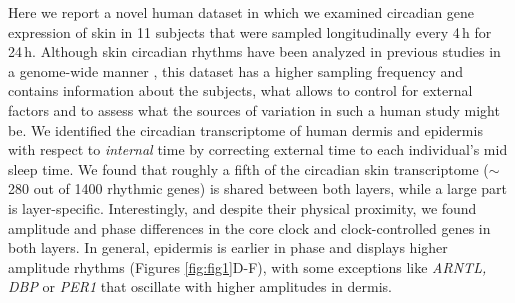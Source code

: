 \normalsize

Here we report a novel human dataset in which we examined circadian gene expression of skin in 11 subjects that were sampled longitudinally every 4\,h for 24\,h. Although skin circadian rhythms have been analyzed in previous studies in a genome-wide manner \cite{Wu2018, Wu2020}, this dataset has a higher sampling frequency and contains information about the subjects, what allows to control for external factors and to assess what the sources of variation in such a human study might be. We identified the circadian transcriptome of human dermis and epidermis with respect to \textit{internal} time by correcting external time to each individual's mid sleep time. We found that roughly a fifth of the circadian skin transcriptome ($\sim$280 out of 1400 rhythmic genes) is shared between both layers, while a large part is layer-specific. Interestingly, and despite their physical proximity, we found amplitude and phase differences in the core clock and clock-controlled genes in both layers. In general, epidermis is earlier in phase and displays higher amplitude rhythms (Figures \ref{fig:fig1}D-F), with some exceptions like \textit{ARNTL, DBP} or \textit{PER1} that oscillate with higher amplitudes in dermis.\\ %

